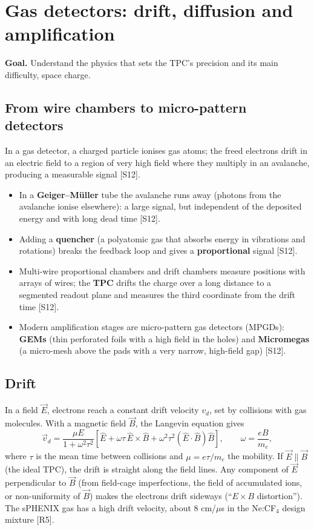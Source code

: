 \documentclass[11pt,letterpaper]{article}
\newcommand{\goal}[1]{\par\noindent\textbf{Goal.} #1\par\smallskip}
\begin{document}
\section{Gas detectors: drift, diffusion and amplification}\label{sec:gas}
\goal{Understand the physics that sets the TPC's precision and its main difficulty, space charge.}

\subsection{From wire chambers to micro-pattern detectors}
In a gas detector, a charged particle ionises gas atoms; the freed electrons drift in an electric field to a region of very high field where they multiply in an avalanche, producing a measurable signal [S12].
\begin{itemize}
\item In a \textbf{Geiger--M\"uller} tube the avalanche runs away (photons from the avalanche ionise elsewhere): a large signal, but independent of the deposited energy and with long dead time [S12].
\item Adding a \textbf{quencher} (a polyatomic gas that absorbs energy in vibrations and rotations) breaks the feedback loop and gives a \textbf{proportional} signal [S12].
\item Multi-wire proportional chambers and drift chambers measure positions with arrays of wires; the \textbf{TPC} drifts the charge over a long distance to a segmented readout plane and measures the third coordinate from the drift time [S12].
\item Modern amplification stages are micro-pattern gas detectors (MPGDs): \textbf{GEMs} (thin perforated foils with a high field in the holes) and \textbf{Micromegas} (a micro-mesh above the pads with a very narrow, high-field gap) [S12].
\end{itemize}

\subsection{Drift}
In a field $\vec E$, electrons reach a constant drift velocity $v_d$, set by collisions with gas molecules.
With a magnetic field $\vec B$, the Langevin equation gives
\begin{equation}
\vec v_d=\frac{\mu E}{1+\omega^2\tau^2}\left[\hat E+\omega\tau\,\hat E\times\hat B+\omega^2\tau^2(\hat E\cdot\hat B)\hat B\right],\qquad\omega=\frac{eB}{m_e},
\end{equation}
where $\tau$ is the mean time between collisions and $\mu=e\tau/m_e$ the mobility.
If $\vec E\parallel\vec B$ (the ideal TPC), the drift is straight along the field lines.
Any component of $\vec E$ perpendicular to $\vec B$ (from field-cage imperfections, the field of accumulated ions, or non-uniformity of $\vec B$) makes the electrons drift sideways (``$E\times B$ distortion'').
The sPHENIX gas has a high drift velocity, about 8 cm/$\mu$s in the Ne:CF$_4$ design mixture [R5].
\end{document}
